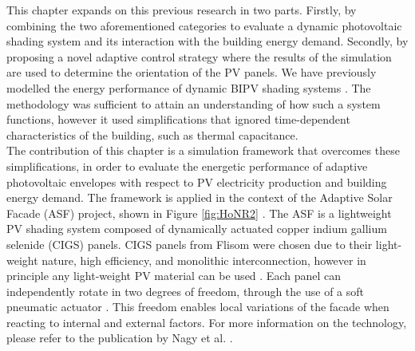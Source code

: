 
This chapter expands on this previous research in two parts. Firstly, by combining the two aforementioned categories to evaluate a dynamic photovoltaic shading system and its interaction with the building energy demand. Secondly, by proposing a novel adaptive control strategy where the results of the simulation are used to determine the orientation of the PV panels. We have previously modelled the energy performance of dynamic BIPV shading systems \cite{jayathissa2016PVSEC}. The methodology was sufficient to attain an understanding of how such a system functions, however it used simplifications that ignored time-dependent characteristics of the building, such as thermal capacitance. \\


The contribution of this chapter is a simulation framework that overcomes these simplifications, in order to evaluate the energetic performance of adaptive photovoltaic envelopes with respect to PV electricity production and building energy demand. The framework is applied in the context of the Adaptive Solar Facade (ASF) project, shown in Figure \ref{fig:HoNR2} \cite{nagy2016adaptive}. The ASF is a lightweight PV shading system composed of dynamically actuated copper indium gallium selenide (CIGS) panels. CIGS panels from Flisom were chosen due to their light-weight nature, high efficiency, and monolithic interconnection, however in principle any light-weight PV material can be used \cite{feurer2016progress}. Each panel can independently rotate in two degrees of freedom, through the use of a soft pneumatic actuator \cite{svetozarevic2016soro}. This freedom enables local variations of the facade when reacting to internal and external factors.  For more information on the technology, please refer to the publication by Nagy et al. \cite{nagy2016adaptive}.\\





